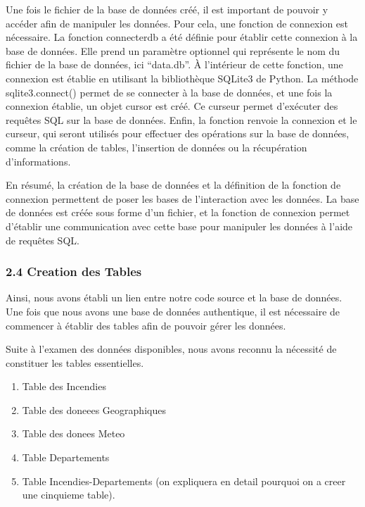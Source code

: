 \documentclass[
]{article}
\providecommand{\tightlist}{%
  \setlength{\itemsep}{0pt}\setlength{\parskip}{0pt}}
\begin{document}
Une fois le fichier de la base de données créé, il est important de
pouvoir y accéder afin de manipuler les données. Pour cela, une fonction
de connexion est nécessaire. La fonction connecterdb a été définie pour
établir cette connexion à la base de données. Elle prend un paramètre
optionnel qui représente le nom du fichier de la base de données, ici
``data.db''. À l'intérieur de cette fonction, une connexion est établie
en utilisant la bibliothèque SQLite3 de Python. La méthode
sqlite3.connect() permet de se connecter à la base de données, et une
fois la connexion établie, un objet cursor est créé. Ce curseur permet
d'exécuter des requêtes SQL sur la base de données. Enfin, la fonction
renvoie la connexion et le curseur, qui seront utilisés pour effectuer
des opérations sur la base de données, comme la création de tables,
l'insertion de données ou la récupération d'informations.

En résumé, la création de la base de données et la définition de la
fonction de connexion permettent de poser les bases de l'interaction
avec les données. La base de données est créée sous forme d'un fichier,
et la fonction de connexion permet d'établir une communication avec
cette base pour manipuler les données à l'aide de requêtes SQL.

\subsubsection{2.4 Creation des Tables}\label{creation-des-tables}

Ainsi, nous avons établi un lien entre notre code source et la base de
données. Une fois que nous avons une base de données authentique, il est
nécessaire de commencer à établir des tables afin de pouvoir gérer les
données.

Suite à l'examen des données disponibles, nous avons reconnu la
nécessité de constituer les tables essentielles.

\begin{enumerate}
\def\labelenumi{\arabic{enumi}.}
\tightlist
\item
  Table des Incendies
\item
  Table des doneees Geographiques
\item
  Table des donees Meteo
\item
  Table Departements
\item
  Table Incendies-Departements (on expliquera en detail pourquoi on a
  creer une cinquieme table).
\end{enumerate}
\end{document}
